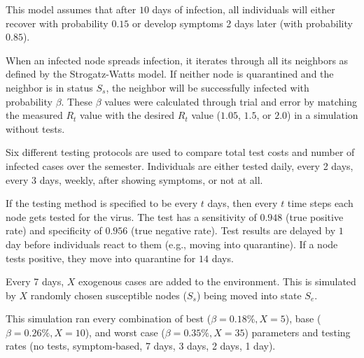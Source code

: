 \documentclass[fullpage]{extarticle}
\begin{document}
\begin{large}
\begin{flushleft}
This model assumes that after $10$ days of infection, all individuals will either recover with probability $0.15$ or develop symptoms 2 days later (with probability $0.85$).\bigbreak

When an infected node spreads infection, it iterates through all its neighbors as defined by the Strogatz-Watts model. If neither node is quarantined and the neighbor is in status $S_s$, the neighbor will be successfully infected with probability $\beta$. These $\beta$ values were calculated through trial and error by matching the measured $R_t$ value with the desired $R_t$ value ($1.05$, $1.5$, or $2.0$) in a simulation without tests.\bigbreak

Six different testing protocols are used to compare total test costs and number of infected cases over the semester. Individuals are either tested daily, every 2 days, every 3 days, weekly, after showing symptoms, or not at all.\bigbreak

If the testing method is specified to be every $t$ days, then every $t$ time steps each node gets tested for the virus. The test has a sensitivity of $0.948$ (true positive rate) and specificity of $0.956$ (true negative rate). Test results are delayed by $1$ day before individuals react to them (e.g., moving into quarantine). If a node tests positive, they move into quarantine for $14$ days.\bigbreak

Every 7 days, $X$ exogenous cases are added to the environment. This is simulated by $X$ randomly chosen susceptible nodes ($S_s$) being moved into state $S_e$.\bigbreak

This simulation ran every combination of best ($\beta = 0.18\%, X = 5$), base ($\beta = 0.26\%, X = 10$), and worst case ($\beta = 0.35\%, X = 35$) parameters and testing rates (no tests, symptom-based, 7 days, 3 days, 2 days, 1 day).\\
\end{flushleft}
\end{large}
\end{document}
